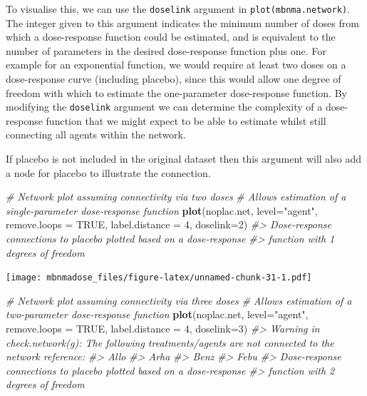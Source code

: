 \documentclass[]{article}
\newenvironment{Shaded}{\begin{snugshade}}{\end{snugshade}}
\newcommand{\CommentTok}[1]{\textcolor[rgb]{0.56,0.35,0.01}{\textit{#1}}}
\newcommand{\DataTypeTok}[1]{\textcolor[rgb]{0.13,0.29,0.53}{#1}}
\newcommand{\DecValTok}[1]{\textcolor[rgb]{0.00,0.00,0.81}{#1}}
\newcommand{\KeywordTok}[1]{\textcolor[rgb]{0.13,0.29,0.53}{\textbf{#1}}}
\newcommand{\NormalTok}[1]{#1}
\newcommand{\OtherTok}[1]{\textcolor[rgb]{0.56,0.35,0.01}{#1}}
\newcommand{\StringTok}[1]{\textcolor[rgb]{0.31,0.60,0.02}{#1}}
\begin{document}
To visualise this, we can use the \texttt{doselink} argument in
\texttt{plot(mbnma.network)}. The integer given to this argument
indicates the minimum number of doses from which a dose-response
function could be estimated, and is equivalent to the number of
parameters in the desired dose-response function plus one. For example
for an exponential function, we would require at least two doses on a
dose-response curve (including placebo), since this would allow one
degree of freedom with which to estimate the one-parameter dose-response
function. By modifying the \texttt{doselink} argument we can determine
the complexity of a dose-response function that we might expect to be
able to estimate whilst still connecting all agents within the network.

If placebo is not included in the original dataset then this argument
will also add a node for placebo to illustrate the connection.

\begin{Shaded}
\begin{Highlighting}[]
\CommentTok{# Network plot assuming connectivity via two doses}
\CommentTok{# Allows estimation of a single-parameter dose-response function}
\KeywordTok{plot}\NormalTok{(noplac.net, }\DataTypeTok{level=}\StringTok{"agent"}\NormalTok{, }\DataTypeTok{remove.loops =} \OtherTok{TRUE}\NormalTok{, }\DataTypeTok{label.distance =} \DecValTok{4}\NormalTok{,}
     \DataTypeTok{doselink=}\DecValTok{2}\NormalTok{)}
\CommentTok{#> Dose-response connections to placebo plotted based on a dose-response}
\CommentTok{#>                    function with 1 degrees of freedom}
\end{Highlighting}
\end{Shaded}

\texttt{[image: mbnmadose\_files/figure-latex/unnamed-chunk-31-1.pdf]}

\begin{Shaded}
\begin{Highlighting}[]

\CommentTok{# Network plot assuming connectivity via three doses}
\CommentTok{# Allows estimation of a two-parameter dose-response function}
\KeywordTok{plot}\NormalTok{(noplac.net, }\DataTypeTok{level=}\StringTok{"agent"}\NormalTok{, }\DataTypeTok{remove.loops =} \OtherTok{TRUE}\NormalTok{, }\DataTypeTok{label.distance =} \DecValTok{4}\NormalTok{,}
     \DataTypeTok{doselink=}\DecValTok{3}\NormalTok{)}
\CommentTok{#> Warning in check.network(g): The following treatments/agents are not connected to the network reference:}
\CommentTok{#> Allo}
\CommentTok{#> Arha}
\CommentTok{#> Benz}
\CommentTok{#> Febu}
\CommentTok{#> Dose-response connections to placebo plotted based on a dose-response}
\CommentTok{#>                    function with 2 degrees of freedom}
\end{Highlighting}
\end{Shaded}
\end{document}
